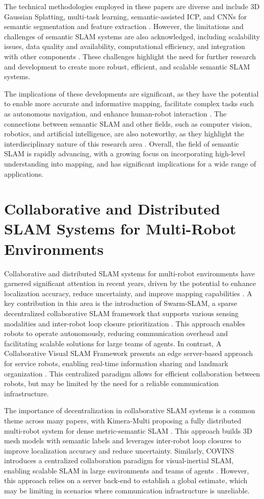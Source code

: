 \documentclass[conference]{IEEEtran}
\begin{document}
The technical methodologies employed in these papers are diverse and include 3D Gaussian Splatting, multi-task learning, semantic-assisted ICP, and CNNs for semantic segmentation and feature extraction \cite{b12}. However, the limitations and challenges of semantic SLAM systems are also acknowledged, including scalability issues, data quality and availability, computational efficiency, and integration with other components \cite{b13}. These challenges highlight the need for further research and development to create more robust, efficient, and scalable semantic SLAM systems.

The implications of these developments are significant, as they have the potential to enable more accurate and informative mapping, facilitate complex tasks such as autonomous navigation, and enhance human-robot interaction \cite{b14}. The connections between semantic SLAM and other fields, such as computer vision, robotics, and artificial intelligence, are also noteworthy, as they highlight the interdisciplinary nature of this research area \cite{b15}. Overall, the field of semantic SLAM is rapidly advancing, with a growing focus on incorporating high-level understanding into mapping, and has significant implications for a wide range of applications.

\section{Collaborative and Distributed SLAM Systems for Multi-Robot Environments}
Collaborative and distributed SLAM systems for multi-robot environments have garnered significant attention in recent years, driven by the potential to enhance localization accuracy, reduce uncertainty, and improve mapping capabilities \cite{b1}. A key contribution in this area is the introduction of Swarm-SLAM, a sparse decentralized collaborative SLAM framework that supports various sensing modalities and inter-robot loop closure prioritization \cite{b2}. This approach enables robots to operate autonomously, reducing communication overhead and facilitating scalable solutions for large teams of agents. In contrast, A Collaborative Visual SLAM Framework presents an edge server-based approach for service robots, enabling real-time information sharing and landmark organization \cite{b3}. This centralized paradigm allows for efficient collaboration between robots, but may be limited by the need for a reliable communication infrastructure.

The importance of decentralization in collaborative SLAM systems is a common theme across many papers, with Kimera-Multi proposing a fully distributed multi-robot system for dense metric-semantic SLAM \cite{b4}. This approach builds 3D mesh models with semantic labels and leverages inter-robot loop closures to improve localization accuracy and reduce uncertainty. Similarly, COVINS introduces a centralized collaboration paradigm for visual-inertial SLAM, enabling scalable SLAM in large environments and teams of agents \cite{b5}. However, this approach relies on a server back-end to establish a global estimate, which may be limiting in scenarios where communication infrastructure is unreliable.
\end{document}
